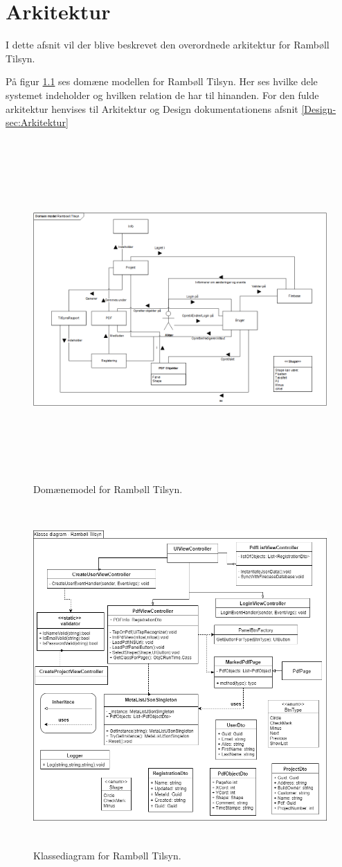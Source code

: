 \chapter{Arkitektur}
I dette afsnit vil der blive beskrevet den overordnede arkitektur for Rambøll Tilsyn.

På figur \ref{fig:Domain} ses domæne modellen for Rambøll Tilsyn. Her ses hvilke dele systemet indeholder og hvilken relation de har til hinanden.
For den fulde arkitektur henvises til Arkitektur og Design dokumentationens afsnit \ref{Design-sec:Arkitektur}

\begin{figure}[H] %
	\centering
	\includegraphics[height=13cm, width=17cm]{Arkitektur/Domainmodel}
	\caption{Domænemodel for Rambøll Tilsyn.}
	\label{fig:Domain}
\end{figure}

\clearpage


\begin{figure}[H] %
	\centering
	\includegraphics[height=13cm, width=17cm]{Arkitektur/KlasseDiagram}
	\caption{Klassediagram for Rambøll Tilsyn.}
	\label{fig:KlasseDiagram}
\end{figure}

